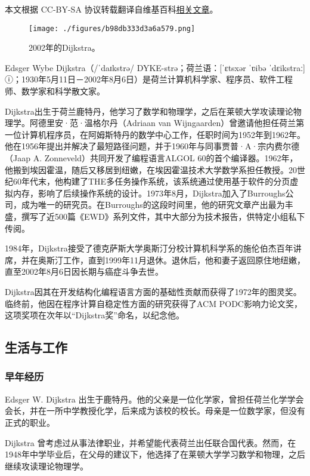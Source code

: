 
本文根据 CC-BY-SA 协议转载翻译自维基百科\href{https://en.wikipedia.org/wiki/Edsger_W._Dijkstra}{相关文章}。

\begin{figure}[ht]
\centering
\texttt{[image: ./figures/b98db333d3a6a579.png]}
\caption{2002年的Dijkstra。} \label{fig_ACHR_1}
\end{figure}
Edsger Wybe Dijkstra（/ˈdaɪkstrə/ DYKE-strə；荷兰语：[ˈɛtsxər ˈʋibə ˈdɛikstraː] ⓘ；1930年5月11日－2002年8月6日）是荷兰计算机科学家、程序员、软件工程师、数学家和科学散文家。

Dijkstra出生于荷兰鹿特丹，他学习了数学和物理学，之后在莱顿大学攻读理论物理学。阿德里安·范·温格尔丹（Adriaan van Wijngaarden）曾邀请他担任荷兰第一位计算机程序员，在阿姆斯特丹的数学中心工作，任职时间为1952年到1962年。他在1956年提出并解决了最短路径问题，并于1960年与同事贾普·A·宗内费尔德（Jaap A. Zonneveld）共同开发了编程语言ALGOL 60的首个编译器。1962年，他搬到埃因霍温，随后又移居到纽嫩，在埃因霍温技术大学数学系担任教授。20世纪60年代末，他构建了THE多任务操作系统，该系统通过使用基于软件的分页虚拟内存，影响了后续操作系统的设计。1973年8月，Dijkstra加入了Burroughs公司，成为唯一的研究员。在Burroughs的这段时间里，他的研究文章产出最为丰盛，撰写了近500篇《EWD》系列文件，其中大部分为技术报告，供特定小组私下传阅。

1984年，Dijkstra接受了德克萨斯大学奥斯汀分校计算机科学系的施伦伯杰百年讲席，并在奥斯汀工作，直到1999年11月退休。退休后，他和妻子返回原住地纽嫩，直至2002年8月6日因长期与癌症斗争去世。

Dijkstra因其在开发结构化编程语言方面的基础性贡献而获得了1972年的图灵奖。临终前，他因在程序计算自稳定性方面的研究获得了ACM PODC影响力论文奖，这项奖项在次年以“Dijkstra奖”命名，以纪念他。
\subsection{生活与工作} 
\subsubsection{早年经历}  
Edsger W. Dijkstra 出生于鹿特丹。他的父亲是一位化学家，曾担任荷兰化学学会会长，并在一所中学教授化学，后来成为该校的校长。母亲是一位数学家，但没有正式的职业。  

Dijkstra 曾考虑过从事法律职业，并希望能代表荷兰出任联合国代表。然而，在1948年中学毕业后，在父母的建议下，他选择了在莱顿大学学习数学和物理，之后继续攻读理论物理学。  

